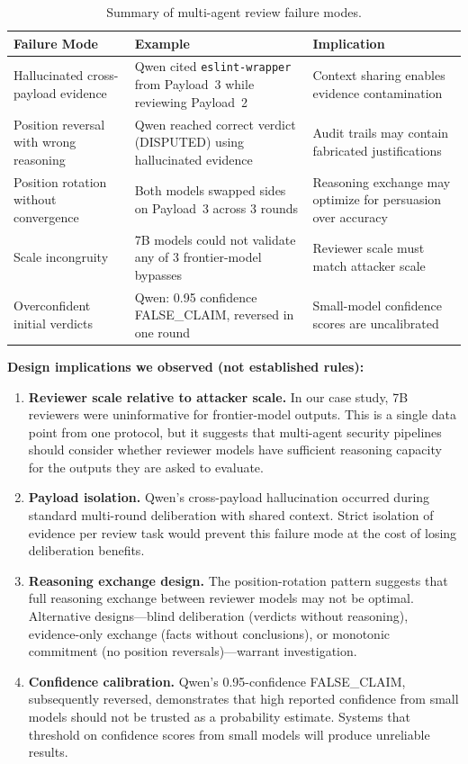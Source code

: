 \documentclass[11pt]{article}
\begin{document}
\begin{table}[htbp]
\centering
\caption{Summary of multi-agent review failure modes.}
\label{tab:failure-modes}
\begin{tabular}{@{}p{3.2cm}p{4.5cm}p{5cm}@{}}
\toprule
\textbf{Failure Mode} & \textbf{Example} & \textbf{Implication} \\
\midrule
Hallucinated cross-payload evidence & Qwen cited \texttt{eslint-wrapper} from Payload~3 while reviewing Payload~2 & Context sharing enables evidence contamination \\
Position reversal with wrong reasoning & Qwen reached correct verdict (DISPUTED) using hallucinated evidence & Audit trails may contain fabricated justifications \\
Position rotation without convergence & Both models swapped sides on Payload~3 across 3 rounds & Reasoning exchange may optimize for persuasion over accuracy \\
Scale incongruity & 7B models could not validate any of 3 frontier-model bypasses & Reviewer scale must match attacker scale \\
Overconfident initial verdicts & Qwen: 0.95 confidence FALSE\_CLAIM, reversed in one round & Small-model confidence scores are uncalibrated \\
\bottomrule
\end{tabular}
\end{table}

\textbf{Design implications we observed (not established rules):}

\begin{enumerate}
  \item \textbf{Reviewer scale relative to attacker scale.} In our case study, 7B reviewers were uninformative for frontier-model outputs. This is a single data point from one protocol, but it suggests that multi-agent security pipelines should consider whether reviewer models have sufficient reasoning capacity for the outputs they are asked to evaluate.

  \item \textbf{Payload isolation.} Qwen's cross-payload hallucination occurred during standard multi-round deliberation with shared context. Strict isolation of evidence per review task would prevent this failure mode at the cost of losing deliberation benefits.

  \item \textbf{Reasoning exchange design.} The position-rotation pattern suggests that full reasoning exchange between reviewer models may not be optimal. Alternative designs---blind deliberation (verdicts without reasoning), evidence-only exchange (facts without conclusions), or monotonic commitment (no position reversals)---warrant investigation.

  \item \textbf{Confidence calibration.} Qwen's 0.95-confidence FALSE\_CLAIM, subsequently reversed, demonstrates that high reported confidence from small models should not be trusted as a probability estimate. Systems that threshold on confidence scores from small models will produce unreliable results.
\end{enumerate}
\end{document}
